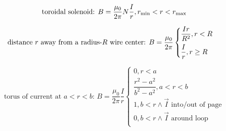 \documentclass[12pt]{article}
\newcommand \vpx [1]{\vspace{#1px}}
\begin{document}
\begin{equation}
	\text{toroidal solenoid: } B = \dfrac{\mu_0}{2 \pi} N \dfrac I r, r_{\rm min} < r < r_{\rm max}
\end{equation}

\begin{equation}
	\text{distance $r$ away from a radius-$R$ wire center: } B = \dfrac{\mu_0}{2 \pi} \begin{cases}
		\vpx 5
		\dfrac {I r} {R^2}, r < R \\
		\dfrac I r, r \ge R
	\end{cases}
\end{equation}

\begin{equation}
	\text{torus of current at $a < r < b$: } B = \dfrac {\mu_0} {2 \pi} \dfrac I r \begin{cases}
		0, r < a \\
		\dfrac {r^2 - a^2} {b^2 - a^2}, a < r < b \\
		1, b < r \land \vec I \text{ into/out of page} \\
		0, b < r \land \vec I \text{ around loop} \\
	\end{cases}
\end{equation}




\end{document}
